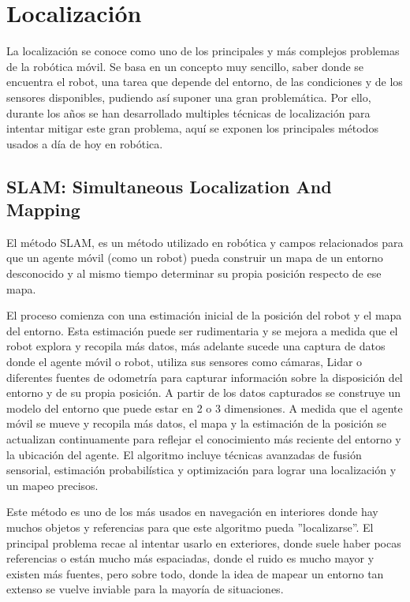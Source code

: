 \section{Localización}
La localización se conoce como uno de los principales y más complejos problemas de la robótica móvil. Se basa en un concepto 
muy sencillo, saber donde se encuentra el robot, una tarea que depende del entorno, de las condiciones y de los sensores disponibles, 
pudiendo así suponer una gran problemática. Por ello, durante los años se han desarrollado multiples técnicas de localización para intentar mitigar este 
gran problema, aquí se exponen los principales métodos usados a día de hoy en robótica.

\subsection{SLAM: Simultaneous Localization And Mapping}
El método SLAM, es un método utilizado en robótica y campos relacionados para que un agente móvil (como un robot) pueda construir un mapa de un 
entorno desconocido y al mismo tiempo determinar su propia posición respecto de ese mapa.

El proceso comienza con una estimación inicial de la posición del robot y el mapa del entorno. Esta estimación puede ser rudimentaria y 
se mejora a medida que el robot explora y recopila más datos, más adelante sucede una captura de datos donde el agente móvil o robot, utiliza sus 
sensores como cámaras, Lidar o diferentes fuentes de odometría para capturar información sobre la disposición del entorno y de su propia 
posición. A partir de los datos capturados se construye un modelo del entorno que puede estar en 2 o 3 dimensiones. A medida que el agente móvil se mueve 
y recopila más datos, el mapa y la estimación de la posición se actualizan continuamente para reflejar el conocimiento más reciente del 
entorno y la ubicación del agente. El algoritmo incluye técnicas avanzadas de fusión sensorial, estimación probabilística y optimización 
para lograr una localización y un mapeo precisos.

Este método es uno de los más usados en navegación en interiores donde hay muchos objetos y referencias para que este algoritmo pueda 
''localizarse''. El principal problema recae al intentar usarlo en exteriores, donde suele haber pocas referencias o están mucho más 
espaciadas, donde el ruido es mucho mayor y existen más fuentes, pero sobre todo, donde la idea de mapear un entorno tan extenso se vuelve 
inviable para la mayoría de situaciones.

